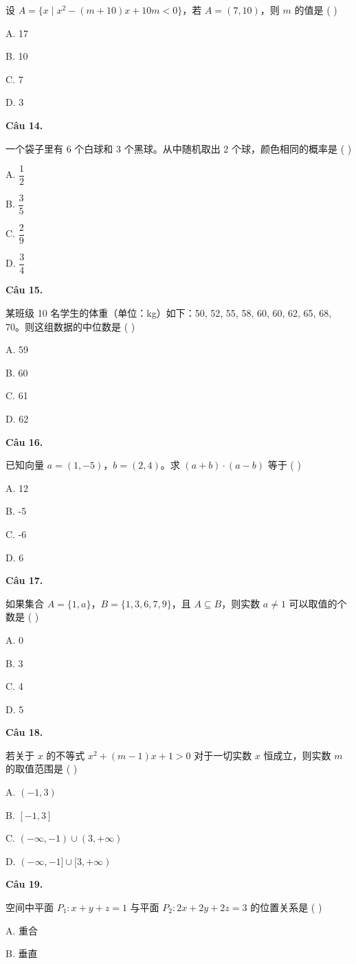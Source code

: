 \documentclass[11pt, a4paper]{article}
\begin{document}
设 $A = \{x \mid x^2 - (m + 10)x + 10m < 0\}$，若 $A = (7, 10)$，则 $m$ 的值是 ( )

A. 17

B. 10

C. 7

D. 3

\textbf{Câu 14.}

一个袋子里有 6 个白球和 3 个黑球。从中随机取出 2 个球，颜色相同的概率是 ( )

A. $\dfrac{1}{2}$

B. $\dfrac{3}{5}$

C. $\dfrac{2}{9}$

D. $\dfrac{3}{4}$

\textbf{Câu 15.}

某班级 10 名学生的体重（单位：kg）如下：50, 52, 55, 58, 60, 60, 62, 65, 68, 70。则这组数据的中位数是 ( )

A. 59

B. 60

C. 61

D. 62

\textbf{Câu 16.}

已知向量 $a = (1, -5)$，$b = (2, 4)$。求 $(a + b) \cdot (a - b)$ 等于 ( )

A. 12

B. -5

C. -6

D. 6

\textbf{Câu 17.}

如果集合 $A = \{1, a\}$，$B = \{1, 3, 6, 7, 9\}$，且 $A \subseteq B$，则实数 $a \ne 1$ 可以取值的个数是 ( )

A. 0

B. 3

C. 4

D. 5

\textbf{Câu 18.}

若关于 $x$ 的不等式 $x^2 + (m - 1)x + 1 > 0$ 对于一切实数 $x$ 恒成立，则实数 $m$ 的取值范围是 ( )

A. $(-1, 3)$

B. $[-1, 3]$

C. $(-\infty, -1) \cup (3, +\infty)$

D. $(-\infty, -1] \cup [3, +\infty)$

\textbf{Câu 19.}

空间中平面 $P_1: x + y + z = 1$ 与平面 $P_2: 2x + 2y + 2z = 3$ 的位置关系是 ( )

A. 重合

B. 垂直
\end{document}
